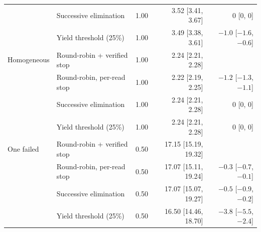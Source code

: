 \begin{table}[!t]
\begin{tabular}{@{}llrrr@{}}
 & Successive elimination & 1.00 & 3.52 [3.41, 3.67] & $0$ [$0$, $0$] \\
 & Yield threshold (25\%) & 1.00 & 3.49 [3.38, 3.61] & $-1.0$ [$-1.6$, $-0.6$] \\
\midrule
Homogeneous & Round-robin + verified stop & 1.00 & 2.24 [2.21, 2.28] &  \\
 & Round-robin, per-read stop & 1.00 & 2.22 [2.19, 2.25] & $-1.2$ [$-1.3$, $-1.1$] \\
 & Successive elimination & 1.00 & 2.24 [2.21, 2.28] & $0$ [$0$, $0$] \\
 & Yield threshold (25\%) & 1.00 & 2.24 [2.21, 2.28] & $0$ [$0$, $0$] \\
\midrule
One failed & Round-robin + verified stop & 0.50 & 17.15 [15.19, 19.32] &  \\
 & Round-robin, per-read stop & 0.50 & 17.07 [15.11, 19.24] & $-0.3$ [$-0.7$, $-0.1$] \\
 & Successive elimination & 0.50 & 17.07 [15.07, 19.27] & $-0.5$ [$-0.9$, $-0.2$] \\
 & Yield threshold (25\%) & 0.50 & 16.50 [14.46, 18.70] & $-3.8$ [$-5.5$, $-2.4$] \\
\bottomrule
\end{tabular}
\end{table}
